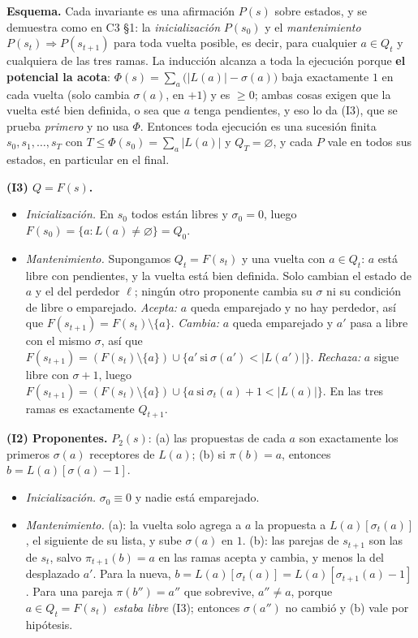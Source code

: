 \documentclass[11pt]{article}
\begin{document}
\textbf{Esquema.} Cada invariante es una afirmación $P(s)$ sobre estados, y se demuestra como en C3 §1: la
\emph{inicialización} $P(s_0)$ y el \emph{mantenimiento} $P(s_t)\Rightarrow P(s_{t+1})$ para toda vuelta posible,
es decir, para cualquier $a\in Q_t$ y cualquiera de las tres ramas. La inducción alcanza a toda la ejecución
porque \textbf{el potencial la acota}: $\Phi(s)=\sum_a\bigl(|L(a)|-\sigma(a)\bigr)$ baja exactamente $1$ en cada
vuelta (solo cambia $\sigma(a)$, en $+1$) y es $\ge0$; ambas cosas exigen que la vuelta esté bien definida, o sea
que $a$ tenga pendientes, y eso lo da (I3), que se prueba \emph{primero} y no usa $\Phi$. Entonces toda ejecución es
una sucesión finita $s_0,s_1,\dots,s_T$ con $T\le\Phi(s_0)=\sum_a|L(a)|$ y $Q_T=\varnothing$, y cada $P$ vale en
todos sus estados, en particular en el final.

\textbf{(I3) $Q=F(s)$.}
\begin{itemize}[leftmargin=14pt,itemsep=2pt]
\item \emph{Inicialización.} En $s_0$ todos están libres y $\sigma_0=0$, luego $F(s_0)=\{a:L(a)\ne\varnothing\}=Q_0$.
\item \emph{Mantenimiento.} Supongamos $Q_t=F(s_t)$ y una vuelta con $a\in Q_t$: $a$ está libre con pendientes, y la
vuelta está bien definida. Solo cambian el estado de $a$ y el del perdedor $\ell$; ningún otro proponente cambia
su $\sigma$ ni su condición de libre o emparejado. \emph{Acepta:} $a$ queda emparejado y no hay perdedor, así que
$F(s_{t+1})=F(s_t)\setminus\{a\}$. \emph{Cambia:} $a$ queda emparejado y $a'$ pasa a libre con el mismo $\sigma$, así
que $F(s_{t+1})=(F(s_t)\setminus\{a\})\cup\{a'\ \text{si}\ \sigma(a')<|L(a')|\}$. \emph{Rechaza:} $a$ sigue libre con
$\sigma+1$, luego $F(s_{t+1})=(F(s_t)\setminus\{a\})\cup\{a\ \text{si}\ \sigma_t(a)+1<|L(a)|\}$. En las tres ramas es
exactamente $Q_{t+1}$.
\end{itemize}

\textbf{(I2) Proponentes.} $P_2(s)$: (a) las propuestas de cada $a$ son exactamente los primeros $\sigma(a)$
receptores de $L(a)$; (b) si $\pi(b)=a$, entonces $b=L(a)[\sigma(a)-1]$.
\begin{itemize}[leftmargin=14pt,itemsep=2pt]
\item \emph{Inicialización.} $\sigma_0\equiv0$ y nadie está emparejado.
\item \emph{Mantenimiento.} (a): la vuelta solo agrega a $a$ la propuesta a $L(a)[\sigma_t(a)]$, el siguiente de su
lista, y sube $\sigma(a)$ en $1$. (b): las parejas de $s_{t+1}$ son las de $s_t$, salvo $\pi_{t+1}(b)=a$ en las
ramas acepta y cambia, y menos la del desplazado $a'$. Para la nueva, $b=L(a)[\sigma_t(a)]=L(a)[\sigma_{t+1}(a)-1]$.
Para una pareja $\pi(b'')=a''$ que sobrevive, $a''\ne a$, porque $a\in Q_t=F(s_t)$ \emph{estaba libre} (I3); entonces
$\sigma(a'')$ no cambió y (b) vale por hipótesis.
\end{itemize}
\end{document}

